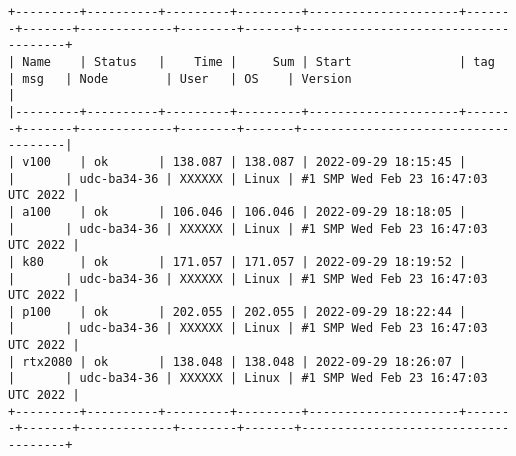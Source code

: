 \begin{verbatim}
+---------+----------+---------+---------+---------------------+-------+-------+-------------+--------+-------+-------------------------------------+
| Name    | Status   |    Time |     Sum | Start               | tag   | msg   | Node        | User   | OS    | Version                             |
|---------+----------+---------+---------+---------------------+-------+-------+-------------+--------+-------+-------------------------------------|
| v100    | ok       | 138.087 | 138.087 | 2022-09-29 18:15:45 |       |       | udc-ba34-36 | XXXXXX | Linux | #1 SMP Wed Feb 23 16:47:03 UTC 2022 |
| a100    | ok       | 106.046 | 106.046 | 2022-09-29 18:18:05 |       |       | udc-ba34-36 | XXXXXX | Linux | #1 SMP Wed Feb 23 16:47:03 UTC 2022 |
| k80     | ok       | 171.057 | 171.057 | 2022-09-29 18:19:52 |       |       | udc-ba34-36 | XXXXXX | Linux | #1 SMP Wed Feb 23 16:47:03 UTC 2022 |
| p100    | ok       | 202.055 | 202.055 | 2022-09-29 18:22:44 |       |       | udc-ba34-36 | XXXXXX | Linux | #1 SMP Wed Feb 23 16:47:03 UTC 2022 |
| rtx2080 | ok       | 138.048 | 138.048 | 2022-09-29 18:26:07 |       |       | udc-ba34-36 | XXXXXX | Linux | #1 SMP Wed Feb 23 16:47:03 UTC 2022 |
+---------+----------+---------+---------+---------------------+-------+-------+-------------+--------+-------+-------------------------------------+
\end{verbatim}
